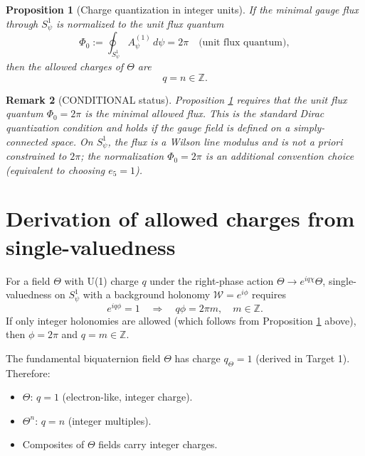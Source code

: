 \documentclass[11pt,a4paper]{article}
\newtheorem{proposition}{Proposition}[section]
\newtheorem{remark}[proposition]{Remark}
\begin{document}
\begin{proposition}[Charge quantization in integer units]
\label{prop:charge-quant}
If the minimal gauge flux through $S^1_\psi$ is normalized to the unit flux
quantum
\begin{equation}
  \Phi_0 := \oint_{S^1_\psi}A_\psi^{(1)}\,d\psi = 2\pi
  \quad\text{(unit flux quantum)},
\end{equation}
then the allowed charges of $\Theta$ are
\begin{equation}
  q = n \in \mathbb{Z}.
\end{equation}
\end{proposition}

\begin{remark}[CONDITIONAL status]
Proposition \ref{prop:charge-quant} requires that the unit flux quantum
$\Phi_0=2\pi$ is the minimal allowed flux.  This is the standard Dirac
quantization condition and holds if the gauge field is defined on a
simply-connected space.  On $S^1_\psi$, the flux is a Wilson line modulus and
is not a priori constrained to $2\pi$; the normalization $\Phi_0=2\pi$ is an
additional convention choice (equivalent to choosing $e_5=1$).
\end{remark}

\section{Derivation of allowed charges from single-valuedness}

For a field $\Theta$ with U(1) charge $q$ under the right-phase action
$\Theta\to e^{iq\chi}\Theta$, single-valuedness on $S^1_\psi$ with a
background holonomy $\mathcal{W}=e^{i\phi}$ requires
\begin{equation}
  e^{iq\phi}=1 \quad\Rightarrow\quad q\phi = 2\pi m,\quad m\in\mathbb{Z}.
\end{equation}
If only integer holonomies are allowed (which follows from Proposition
\ref{prop:charge-quant} above), then $\phi=2\pi$ and $q=m\in\mathbb{Z}$.

The fundamental biquaternion field $\Theta$ has charge $q_\Theta=1$ (derived in
Target 1).  Therefore:
\begin{itemize}
  \item $\Theta$: $q=1$ (electron-like, integer charge).
  \item $\Theta^n$: $q=n$ (integer multiples).
  \item Composites of $\Theta$ fields carry integer charges.
\end{itemize}
\end{document}
